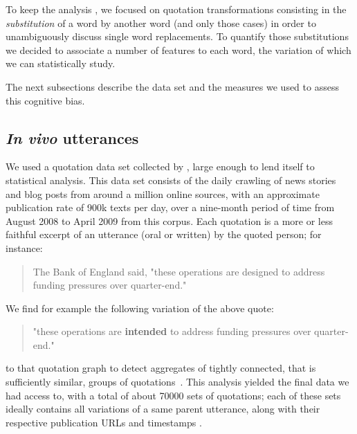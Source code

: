 To keep the analysis , we focused on quotation transformations consisting in the \emph{substitution} of a word by another word (and only those cases) in order to unambiguously discuss single word replacements.
To quantify those substitutions we decided to associate a number of features to each word, the variation of which we can statistically study.

The next subsections describe the data set and the measures we used to assess this cognitive bias.

\subsection{\emph{In vivo} utterances}

We used a quotation data set collected by \citet{leskovec_meme-tracking_2009}, large enough to lend itself to statistical analysis.
This data set consists of the daily crawling of news stories and blog posts from around a million online sources, with an approximate publication rate of 900k texts per day, over a nine-month period of time from August 2008 to April 2009 
 from this corpus.
Each quotation is a more or less faithful excerpt of an utterance (oral or written) by the quoted person; for instance:
\begin{quote}
The Bank of England said, "these operations are designed to address funding pressures over quarter-end."
\end{quote}

We find for example the following variation of the above quote:
\begin{quote}
"these operations are \textbf{intended} to address funding pressures over quarter-end."
\end{quote}
 to that quotation graph to detect aggregates of tightly connected, that is sufficiently similar, groups of quotations~\citep[see again][for more details]{leskovec_meme-tracking_2009}.
This analysis yielded the final data we had access to, with a total of about \num{70000} sets of quotations; each of these sets ideally contains all variations of a same parent utterance, along with their respective publication URLs and timestamps .

